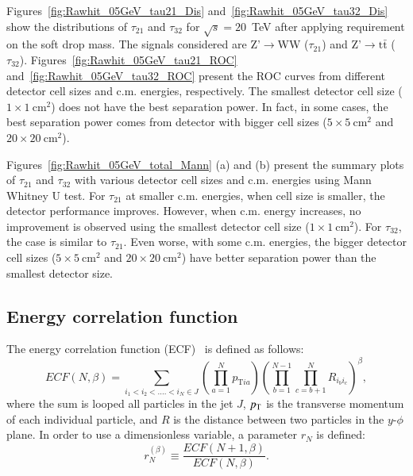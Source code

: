 Figures~\ref{fig:Rawhit_05GeV_tau21_Dis} and~\ref{fig:Rawhit_05GeV_tau32_Dis} 
show the distributions of $\tau_{21}$ and $\tau_{32}$ for $\sqrt{s}=20$~TeV 
after applying requirement on the soft drop mass. The signals considered are 
Z'$\rightarrow$WW ($\tau_{21}$) and 
Z'$\rightarrow\mathrm{t}\bar{\mathrm{t}}$ ($\tau_{32}$). 
Figures~\ref{fig:Rawhit_05GeV_tau21_ROC} and~\ref{fig:Rawhit_05GeV_tau32_ROC} 
present the ROC curves from different detector cell sizes and c.m. energies, 
respectively. The smallest detector cell size ($1\times1~\mathrm{cm}^2$) 
does not have the best separation power. In fact, in some cases, 
the best separation power comes from detector with bigger cell sizes 
($5\times5~\mathrm{cm}^2$ and $20\times20~\mathrm{cm}^2$).

Figures~\ref{fig:Rawhit_05GeV_total_Mann} (a) and (b) present the summary plots of $\tau_{21}$ and $\tau_{32}$ with various detector cell sizes and c.m. energies using Mann Whitney U test. For $\tau_{21}$ at smaller c.m. energies, when 
cell size is smaller, the detector performance improves. However, 
when c.m. energy increases, no improvement 
is observed using the smallest detector cell size ($1\times1~\mathrm{cm}^2$). 
For $\tau_{32}$, the case is similar to  $\tau_{21}$. Even worse, with some 
c.m. energies, the bigger detector cell sizes ($5\times5~\mathrm{cm}^2$ and $20\times20~\mathrm{cm}^2$) have better separation power than the smallest 
detector size. 

\subsection{Energy correlation function \label{sec:ecf}}
The energy correlation function (ECF)~\cite{Larkoski:2013eya} is defined as follows: 
\begin{equation} \label{eq:ECF_Modified}
ECF(N,\beta)=\sum_{i_{1}<i_{2}<....<i_{N}\in J} \left(\prod_{a=1}^{N}p_{\mathrm{T}ia}\right)\left(\prod_{b=1}^{N-1}\prod_{c=b+1}^{N} R_{i_{b}i_{c}}\right)^{\beta},
\end{equation}
where the sum is looped all particles in the jet $J$, $p_{\mathrm{T}}$ is the transverse 
momentum of each individual particle, and $R$ is the distance between two 
particles in the $y$-$\phi$ plane.  
In order to use a dimensionless variable, a parameter $r_{N}$ is defined:
\begin{equation} \label{eq:ECF_ratio}
r_{N}^{(\beta)}\equiv\frac{ECF(N+1,\beta)}{ECF(N,\beta)}.
\end{equation}

